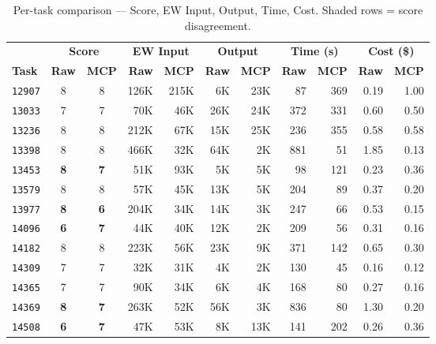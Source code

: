 \begin{table}[!htbp]
\centering
\small
\caption{Per-task comparison --- Score, EW Input, Output, Time, Cost.
         Shaded rows = score disagreement.}\label{tab:sbs-sonnet}
\setlength{\tabcolsep}{3.5pt}
\begin{tabular}{l cc rr rr rr rr}
\toprule
& \multicolumn{2}{c}{\textbf{Score}}
& \multicolumn{2}{c}{\textbf{EW Input}}
& \multicolumn{2}{c}{\textbf{Output}}
& \multicolumn{2}{c}{\textbf{Time (s)}}
& \multicolumn{2}{c}{\textbf{Cost (\$)}} \\
\cmidrule(lr){2-3}\cmidrule(lr){4-5}\cmidrule(lr){6-7}\cmidrule(lr){8-9}\cmidrule(lr){10-11}
\textbf{Task}
& \textbf{Raw} & \textbf{MCP}
& \textbf{Raw} & \textbf{MCP}
& \textbf{Raw} & \textbf{MCP}
& \textbf{Raw} & \textbf{MCP}
& \textbf{Raw} & \textbf{MCP} \\
\midrule
\texttt{12907} & 8 & 8 & 126K & 215K &  6K & 23K &   87 &  369 & 0.19 & 1.00 \\
\texttt{13033} & 7 & 7 &  70K &  46K & 26K & 24K &  372 &  331 & 0.60 & 0.50 \\
\texttt{13236} & 8 & 8 & 212K &  67K & 15K & 25K &  236 &  355 & 0.58 & 0.58 \\
\texttt{13398} & 8 & 8 & 466K &  32K & 64K &  2K &  881 &   51 & 1.85 & 0.13 \\
\rowcolor{gray!15}
\texttt{13453} & \textbf{8} & \textbf{7} &  51K &  93K &  5K &  5K &   98 &  121 & 0.23 & 0.36 \\
\texttt{13579} & 8 & 8 &  57K &  45K & 13K &  5K &  204 &   89 & 0.37 & 0.20 \\
\rowcolor{gray!15}
\texttt{13977} & \textbf{8} & \textbf{6} & 204K &  34K & 14K &  3K &  247 &   66 & 0.53 & 0.15 \\
\rowcolor{gray!15}
\texttt{14096} & \textbf{6} & \textbf{7} &  44K &  40K & 12K &  2K &  209 &   56 & 0.31 & 0.16 \\
\texttt{14182} & 8 & 8 & 223K &  56K & 23K &  9K &  371 &  142 & 0.65 & 0.30 \\
\texttt{14309} & 7 & 7 &  32K &  31K &  4K &  2K &  130 &   45 & 0.16 & 0.12 \\
\texttt{14365} & 7 & 7 &  90K &  34K &  6K &  4K &  168 &   80 & 0.27 & 0.16 \\
\rowcolor{gray!15}
\texttt{14369} & \textbf{8} & \textbf{7} & 263K &  52K & 56K &  3K &  836 &   80 & 1.30 & 0.20 \\
\rowcolor{gray!15}
\texttt{14508} & \textbf{6} & \textbf{7} &  47K &  53K &  8K & 13K &  141 &  202 & 0.26 & 0.36 \\

\end{tabular}
\end{table}
